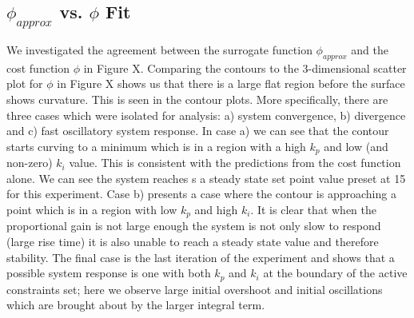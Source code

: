 \documentclass[conference]{IEEEtran}
\theoremstyle{definition}
\begin{document}
\subsection{$\phi_{approx}$ vs. $\phi$ Fit }
We investigated the agreement between the surrogate function $\phi_{approx}$ and the cost function $\phi$ in Figure X. Comparing the contours to the 3-dimensional scatter plot for $\phi$ in Figure X shows us that there is a large flat region before the surface shows curvature. This is seen in the contour plots. More specifically, there are three cases which were isolated for analysis: a) system convergence, b) divergence and c) fast oscillatory system response. In case a) we can see that the contour starts curving to a minimum which is in a region with a high $k_p$ and low (and non-zero) $k_i$ value. This is consistent with the predictions from the cost function alone. We can see the system reaches s a steady state set point value preset at 15 for this experiment. Case b) presents a case where the contour is approaching a point which is in a region with low $k_p$ and high $k_i$. It is clear that when the proportional gain is not large enough the system is not only slow to respond (large rise time) it is also unable to reach a steady state value and therefore stability. The final case is the last iteration of the experiment and shows that a possible system response is one with both $k_p$ and $k_i$ at the boundary of the active constraints set; here we observe large initial overshoot and initial oscillations which are brought about by the larger integral term. 
\end{document}
